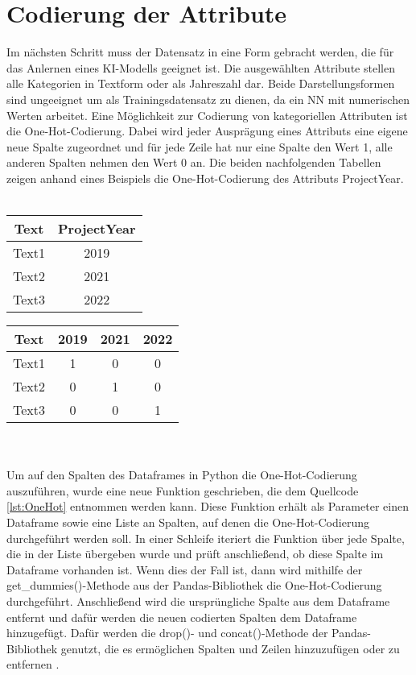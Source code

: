 \section{Codierung der Attribute}
Im nächsten Schritt muss der Datensatz in eine Form gebracht werden, die für das Anlernen eines \ac{KI}-Modells geeignet ist. Die ausgewählten Attribute stellen alle Kategorien in 
Textform oder als Jahreszahl dar. Beide Darstellungsformen sind ungeeignet um als Trainingsdatensatz zu dienen, da ein \ac{NN} mit numerischen Werten arbeitet. 
Eine Möglichkeit zur Codierung von kategoriellen Attributen ist die One-Hot-Codierung. Dabei wird jeder Ausprägung eines Attributs eine eigene neue Spalte zugeordnet 
und für jede Zeile hat nur eine Spalte den Wert 1, alle anderen Spalten nehmen den Wert 0 an. Die beiden nachfolgenden Tabellen zeigen anhand eines Beispiels die 
One-Hot-Codierung des Attributs \glqq ProjectYear\grqq{}.
\\  
\\
\begin{minipage}[c]{0.5\textwidth}
    \centering
    \begin{tabular}{|c|c|}
        \hline
        \textbf{Text} & \textbf{ProjectYear}\\ \hline
        Text1&2019\\
        Text2&2021\\
        Text3&2022\\
        \hline
    \end{tabular}
\end{minipage}
\begin{minipage}[c]{0.5\textwidth}
    \centering
    \begin{tabular}{|c|c|c|c|}
        \hline
        \textbf{Text} & \textbf{2019} & \textbf{2021} & \textbf{2022}\\ \hline
        Text1 & 1 & 0 & 0\\
        Text2 & 0 & 1 & 0\\
        Text3 & 0 & 0 & 1\\
        \hline
    \end{tabular}
\end{minipage}
\\
\\
Um auf den Spalten des Dataframes in Python die One-Hot-Codierung auszuführen, wurde eine neue Funktion geschrieben, die dem Quellcode \ref{lst:OneHot} entnommen werden kann.
Diese Funktion erhält als Parameter einen Dataframe sowie eine Liste an Spalten, auf denen die One-Hot-Codierung durchgeführt werden soll. In einer Schleife iteriert die Funktion 
über jede Spalte, die in der Liste übergeben wurde und prüft anschließend, ob diese Spalte im Dataframe vorhanden ist. Wenn dies der Fall ist, dann wird mithilfe der 
get\_dummies()-Methode aus der Pandas-Bibliothek die One-Hot-Codierung durchgeführt. Anschließend wird die ursprüngliche Spalte aus dem Dataframe entfernt und dafür werden
die neuen codierten Spalten dem Dataframe hinzugefügt. Dafür werden die drop()- und concat()-Methode der Pandas-Bibliothek genutzt, die es ermöglichen Spalten und Zeilen
hinzuzufügen oder zu entfernen \cite{PandasDoc}.

